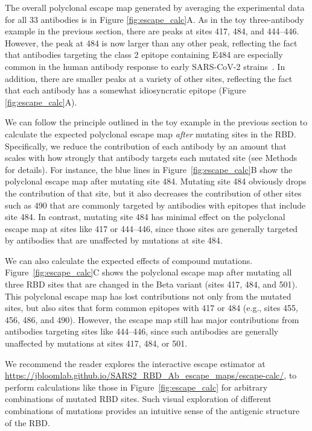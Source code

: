 \documentclass[9pt,twocolumn,twoside]{gsajnl_modified}
\begin{document}
The overall polyclonal escape map generated by averaging the experimental data for all 33 antibodies is in Figure \ref{fig:escape_calc}A.
As in the toy three-antibody example in the previous section, there are peaks at  sites 417, 484, and 444--446.
However, the peak at 484 is now larger than any other peak, reflecting the fact that antibodies targeting the class 2 epitope containing E484 are especially common in the human antibody response to early SARS-CoV-2 strains~\citep{yuan2020structural,robbiani2020convergent,greaney2021comprehensive,greaney2021mapping,chen2021convergent}.
In addition, there are smaller peaks at a variety of other sites, reflecting the fact that each antibody has a somewhat idiosyncratic epitope (Figure \ref{fig:escape_calc}A).

We can follow the principle outlined in the toy example in the previous section to calculate the expected polyclonal escape map \emph{after} mutating sites in the RBD.
Specifically, we reduce the contribution of each antibody by an amount that scales with how strongly that antibody targets each mutated site (see Methods for details).
For instance, the blue lines in Figure~\ref{fig:escape_calc}B show the polyclonal escape map after mutating site 484.
Mutating site 484 obviously drops the contribution of that site, but it also decreases the contribution of other sites such as 490 that are commonly targeted by antibodies with epitopes that include site 484.
In contrast, mutating site 484 has minimal effect on the polyclonal escape map at sites like 417 or 444--446, since those sites are generally targeted by antibodies that are unaffected by mutations at site 484.

We can also calculate the expected effects of compound mutations.
Figure~\ref{fig:escape_calc}C shows the polyclonal escape map after mutating all three RBD sites that are changed in the Beta variant (sites 417, 484, and 501).
This polyclonal escape map has lost contributions not only from the mutated sites, but also sites that form common epitopes with 417 or 484 (e.g., sites 455, 456, 486, and 490).
However, the escape map still has major contributions from antibodies targeting sites like 444--446, since such antibodies are generally unaffected by mutations at sites 417, 484, or 501.

We recommend the reader explores the interactive escape estimator at \url{https://jbloomlab.github.io/SARS2_RBD_Ab_escape_maps/escape-calc/}, to perform calculations like those in Figure~\ref{fig:escape_calc} for arbitrary combinations of mutated RBD sites.
Such visual exploration of different combinations of mutations provides an intuitive sense of the antigenic structure of the RBD.
\end{document}
